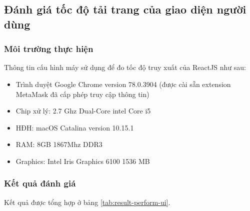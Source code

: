 \documentclass[../main-report.tex]{subfiles}
\begin{document}
\subsection{Đánh giá tốc độ tải trang của giao diện người dùng}
\subsubsection{Môi trường thực hiện}
Thông tin cấu hình máy sử dụng để đo tốc độ truy xuất của ReactJS như sau:

\begin{itemize}
\item Trình duyệt Google Chrome version 78.0.3904 (được cài sẵn extension MetaMask đã cấp phép truy cập thông tin)
\item Chip xử lý: 2.7 Ghz Dual-Core intel Core i5
\item HĐH: macOS Catalina version 10.15.1
\item RAM: 8GB 1867Mhz DDR3
\item Graphics: Intel Iris Graphics 6100 1536 MB
\end{itemize}
\subsubsection{Kết quả đánh giá}
Kết quả được tổng hợp ở bảng \ref{tab:result-perform-ui}.
\end{document}
